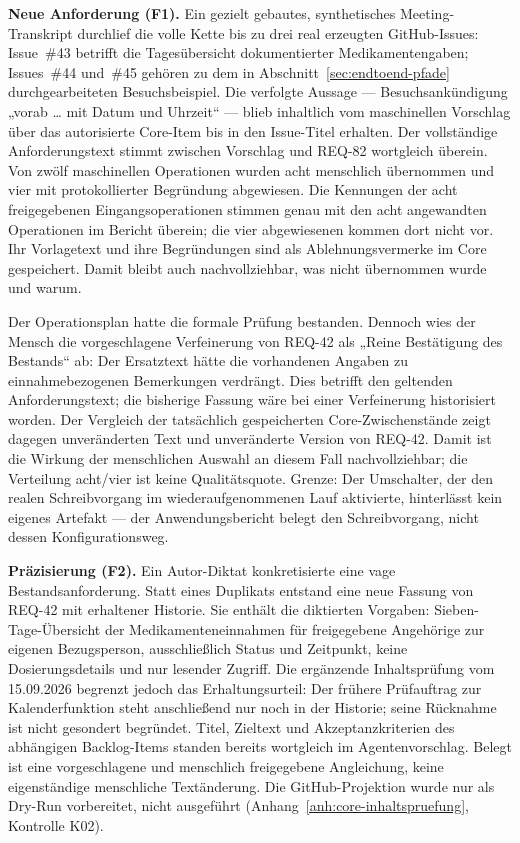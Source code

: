 

\textbf{Neue Anforderung (F1).} Ein gezielt gebautes,
synthetisches Meeting-Transkript durchlief die volle Kette bis zu
drei real erzeugten GitHub-Issues: Issue~\#43 betrifft die
Tagesübersicht dokumentierter Medikamentengaben; Issues~\#44 und~\#45
gehören zu dem in Abschnitt~\ref{sec:endtoend-pfade}
durchgearbeiteten Besuchsbeispiel. Die verfolgte Aussage
--- Besuchsankündigung „vorab \ldots{} mit Datum und Uhrzeit`` ---
blieb inhaltlich vom maschinellen Vorschlag über das autorisierte
Core-Item bis in den Issue-Titel erhalten. Der vollständige
Anforderungstext stimmt zwischen Vorschlag und REQ-82 wortgleich
überein. Von zwölf maschinellen Operationen wurden acht menschlich
übernommen und vier mit protokollierter Begründung abgewiesen.
Die Kennungen der acht freigegebenen Eingangsoperationen stimmen
genau mit den acht angewandten Operationen im Bericht überein;
die vier abgewiesenen kommen dort nicht vor. Ihr Vorlagetext und
ihre Begründungen sind als Ablehnungsvermerke im Core gespeichert.
Damit bleibt auch nachvollziehbar, was nicht übernommen wurde
und warum.

\begin{samepage}
Der Operationsplan hatte die formale Prüfung bestanden. Dennoch
wies der Mensch die vorgeschlagene Verfeinerung von REQ-42 als
„Reine Bestätigung des Bestands`` ab: Der Ersatztext hätte die
vorhandenen Angaben zu einnahmebezogenen Bemerkungen verdrängt.
Dies betrifft den geltenden Anforderungstext; die bisherige
Fassung wäre bei einer Verfeinerung historisiert worden. Der
Vergleich der tatsächlich gespeicherten Core-Zwischenstände zeigt
dagegen unveränderten Text und unveränderte Version von REQ-42.
Damit ist die Wirkung der menschlichen Auswahl an diesem Fall
nachvollziehbar; die Verteilung acht/vier ist keine Qualitätsquote.
Grenze: Der Umschalter, der
den realen Schreibvorgang im wiederaufgenommenen Lauf aktivierte,
hinterlässt kein eigenes Artefakt --- der Anwendungsbericht belegt den
Schreibvorgang, nicht dessen Konfigurationsweg.
\par
\end{samepage}

\textbf{Präzisierung (F2).} Ein Autor-Diktat konkretisierte eine
vage Bestandsanforderung. Statt eines Duplikats entstand eine neue
Fassung von REQ-42 mit erhaltener Historie. Sie enthält die diktierten
Vorgaben: Sieben-Tage-Übersicht der Medikamenteneinnahmen für freigegebene
Angehörige zur eigenen Bezugsperson, ausschließlich Status und Zeitpunkt, keine Dosierungsdetails
und nur lesender Zugriff. Die ergänzende Inhaltsprüfung vom 15.09.2026
begrenzt jedoch das Erhaltungsurteil: Der frühere Prüfauftrag zur
Kalenderfunktion steht anschließend nur noch in der Historie; seine
Rücknahme ist nicht gesondert begründet. Titel, Zieltext und
Akzeptanzkriterien des abhängigen Backlog-Items standen bereits
wortgleich im Agentenvorschlag.
Belegt ist eine vorgeschlagene und menschlich freigegebene Angleichung,
keine eigenständige menschliche Textänderung. Die GitHub-Projektion
wurde nur als Dry-Run vorbereitet, nicht ausgeführt
(Anhang~\ref{anh:core-inhaltspruefung}, Kontrolle K02).

